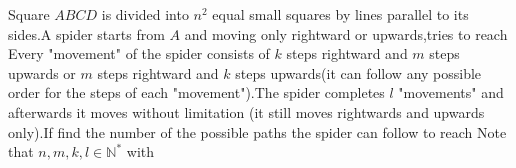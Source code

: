 Square $ABCD$ is divided into $n^2$ equal small squares by lines parallel to its sides.A spider starts from $A$ and moving only rightward or upwards,tries to reach Every "movement" of the spider consists of $k$ steps rightward and $m$ steps upwards or $m$ steps rightward and $k$ steps upwards(it can follow any possible order for the steps of each "movement").The spider completes $l$ "movements" and afterwards it moves without limitation (it still moves rightwards and upwards only).If find the number of the possible paths the spider can follow to reach Note that $n,m,k,l\in \mathbb{N^{*}}$ with 
